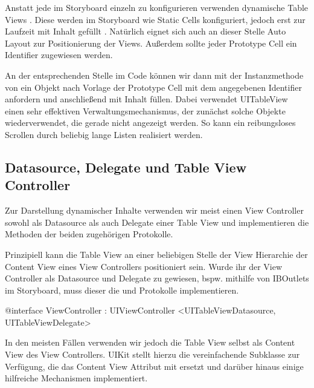 \documentclass[parskip=half, final]{scrreprt}
\begin{document}
Anstatt jede  im Storyboard einzeln zu konfigurieren verwenden dynamische Table Views . Diese werden im Storyboard wie Static Cells konfiguriert, jedoch erst zur Laufzeit mit Inhalt gefüllt . Natürlich eignet sich auch an dieser Stelle Auto Layout zur Positionierung der Views. Außerdem sollte jeder Prototype Cell ein Identifier zugewiesen werden.


An der entsprechenden Stelle im Code können wir dann mit der Instanzmethode  von  ein  Objekt nach Vorlage der Prototype Cell mit dem angegebenen Identifier anfordern und anschließend mit Inhalt füllen. Dabei verwendet UITableView einen sehr effektiven Verwaltungsmechanismus, der zunächst solche  Objekte wiederverwendet, die gerade nicht angezeigt werden. So kann ein reibungsloses Scrollen durch beliebig lange Listen realisiert werden.

\subsection{Datasource, Delegate und Table View Controller}

Zur Darstellung dynamischer Inhalte verwenden wir meist einen View Controller sowohl als Datasource als auch Delegate einer Table View und implementieren die Methoden der beiden zugehörigen Protokolle.

Prinzipiell kann die Table View an einer beliebigen Stelle der View Hierarchie der Content View eines View Controllers positioniert sein. Wurde ihr der View Controller als Datasource und Delegate zu gewiesen, bspw. mithilfe von IBOutlets im Storyboard, muss dieser die  und  Protokolle implementieren.

\begin{objclst}
@interface ViewController : UIViewController <UITableViewDatasource, UITableViewDelegate>
\end{objclst}

In den meisten Fällen verwenden wir jedoch die Table View selbst als Content View des View Controllers. UIKit stellt hierzu die vereinfachende Subklasse  zur Verfügung, die das Content View Attribut  mit  ersetzt und darüber hinaus einige hilfreiche Mechanismen implementiert.
\end{document}

